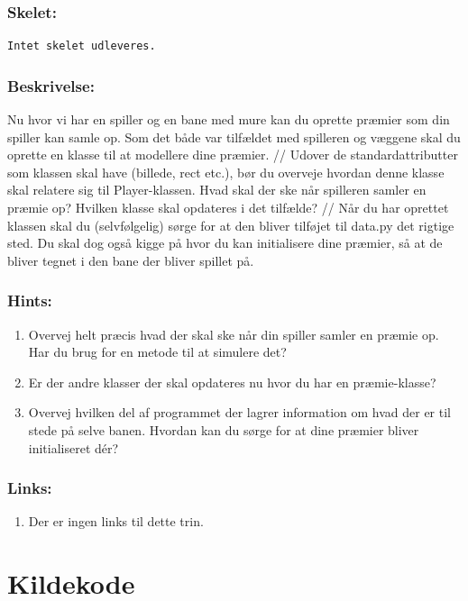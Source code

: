 \documentclass[10pt,a4paper,danish]{article}
\begin{document}
\subsubsection{Skelet:} 
\begin{verbatim}
Intet skelet udleveres. 
\end{verbatim}
\subsubsection{Beskrivelse:}
Nu hvor vi har en spiller og en bane med mure kan du 
oprette præmier som din spiller kan samle op. Som det 
både var tilfældet med spilleren og væggene skal du
oprette en klasse til at modellere dine præmier. 
//
Udover de standardattributter som klassen skal have
(billede, rect etc.), bør du overveje hvordan denne 
klasse skal relatere sig til Player-klassen. Hvad skal 
der ske når spilleren samler en præmie op? Hvilken 
klasse skal opdateres i det tilfælde?
//
Når du har oprettet klassen skal du (selvfølgelig)
sørge for at den bliver tilføjet til data.py det
rigtige sted. Du skal dog også kigge på hvor du
kan initialisere dine præmier, så at de bliver
tegnet i den bane der bliver spillet på.  

\subsubsection{Hints:}
\begin{enumerate}
\item Overvej helt præcis hvad der skal ske
når din spiller samler en præmie op. Har du
brug for en metode til at simulere det?
\item Er der andre klasser der skal opdateres
nu hvor du har en præmie-klasse?
\item Overvej hvilken del af programmet der 
lagrer information om hvad der er til stede 
på selve banen. Hvordan kan du sørge for at
dine præmier bliver initialiseret dér?
\end{enumerate}
\subsubsection{Links:}
\begin{enumerate}
\item Der er ingen links til dette trin. 
\end{enumerate}

\section{Kildekode}

\end{document}
